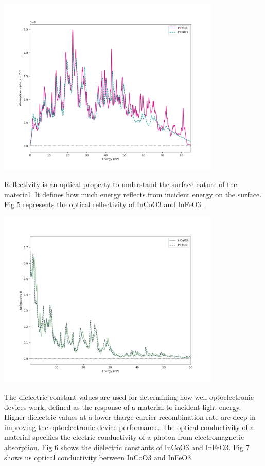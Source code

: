 \documentclass[12pt, letterpaper]{article}
\newcommand*{\1}{\hspace{1pt}}
\begin{document}
    \begin{adjustbox}{center,caption={Absorption Of InCoO3 and InFeO3},label={somelabel},nofloat=figure,vspace=\bigskipamount,}
        \includegraphics[width=0.8\textwidth]{Absorptioneng}
    \end{adjustbox}
    
    Reflectivity is an optical property to understand the surface nature of the material. It defines 
    how much energy reflects from incident energy on the surface. Fig 5 represents the optical reflectivity of InCoO3 and InFeO3. 
    
    \begin{adjustbox}{center,caption={Reflectivity Of InCoO3 and InFeO3},label={somelabel},nofloat=figure,vspace=\bigskipamount,}
        \includegraphics[width=0.8\textwidth]{refleceng}
    \end{adjustbox}
    
    The dielectric constant values are used for determining how well optoelectronic devices work, defined as the response of a material to incident light energy. Higher dielectric values at a lower 
    charge carrier recombination rate are deep in improving the optoelectronic device performance. The optical conductivity of a material specifies the electric 
    conductivity of a photon from electromagnetic absorption. Fig 6 shows the dielectric constants of InCoO3 and InFeO3. Fig 7 shows us optical conductivity between
    InCoO3 and InFeO3.
\end{document}
